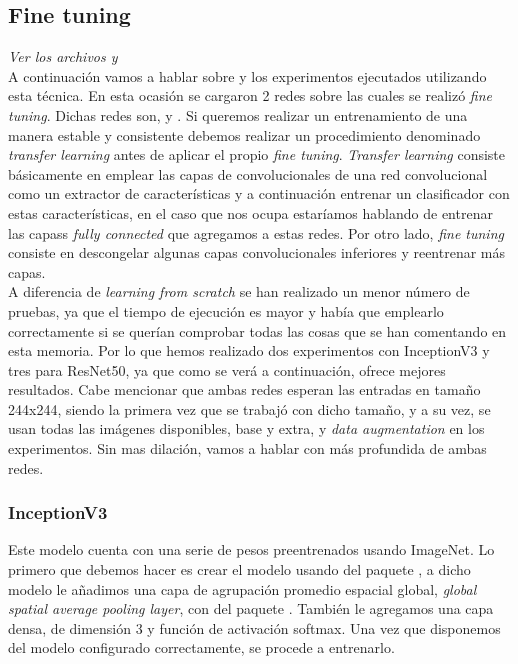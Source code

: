 \subsection{Fine tuning}

\emph{Ver los archivos  y }\\

A continuación vamos a hablar sobre  y los experimentos ejecutados utilizando esta técnica. En esta ocasión se cargaron 2 redes sobre las cuales se realizó \textit{fine tuning}. Dichas redes son,  y . Si queremos realizar un entrenamiento de una manera estable y consistente debemos realizar un procedimiento denominado \textit{transfer learning} antes de aplicar el propio \textit{fine tuning}. \textit{Transfer learning} consiste básicamente en emplear las capas de convolucionales de una red convolucional como un extractor de características y a continuación entrenar un clasificador con estas características, en el caso que nos ocupa estaríamos hablando de entrenar las capass \textit{fully connected} que agregamos a estas redes. Por otro lado, \textit{fine tuning} consiste en descongelar algunas capas convolucionales inferiores y reentrenar más capas.\\

A diferencia de \textit{learning from scratch} se han realizado un menor número de pruebas, ya que el tiempo de ejecución es mayor y había que emplearlo correctamente si se querían comprobar todas las cosas que se han comentando en esta memoria. Por lo que hemos realizado dos experimentos con InceptionV3 y tres para ResNet50, ya que como se verá a continuación, ofrece mejores resultados. Cabe mencionar que ambas redes esperan las entradas en tamaño 244x244, siendo la primera vez que se trabajó con dicho tamaño, y a su vez, se usan todas las imágenes disponibles, base y extra, y \textit{data augmentation} en los experimentos. Sin mas dilación, vamos a hablar con más profundida de ambas redes.\\
 
\subsubsection{InceptionV3}

Este modelo cuenta con una serie de pesos preentrenados usando ImageNet. Lo primero que debemos hacer es crear el modelo usando  del paquete , a dicho modelo le añadimos una capa de agrupación promedio espacial global, \textit{global spatial average pooling layer}, con  del paquete . También le agregamos una capa densa, de dimensión 3 y función de activación softmax. Una vez que disponemos del modelo configurado correctamente, se procede a entrenarlo.\\

